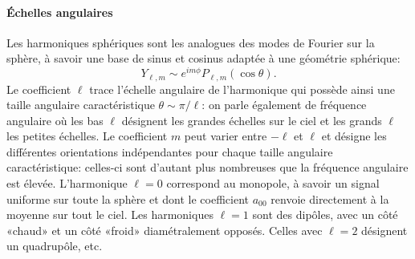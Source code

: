 \paragraph{Échelles angulaires}
 Les harmoniques sphériques sont les analogues des modes de Fourier sur la sphère, à savoir une base de sinus et cosinus adaptée à une géométrie sphérique:
\begin{equation}
Y_{\ell,m}\sim e^{im\phi} P_{\ell,m}(\cos \theta).
\end{equation} 
 Le coefficient $\ell$ trace l'échelle angulaire de l'harmonique qui possède ainsi une taille angulaire caractéristique $\theta\sim\pi/\ell$: on parle également de fréquence angulaire où les bas $\ell$ désignent les grandes échelles sur le ciel et les grands $\ell$ les petites échelles. Le coefficient $m$ peut varier entre $-\ell$ et $\ell$ et désigne les différentes orientations indépendantes pour chaque taille angulaire caractéristique: celles-ci sont d'autant plus nombreuses que la fréquence angulaire est élevée. L'harmonique $\ell=0$ correspond au monopole, à savoir un signal uniforme sur toute la sphère et dont le coefficient $a_{00}$ renvoie directement à la moyenne sur tout le ciel. Les harmoniques $\ell=1$ sont des dipôles, avec un côté «chaud» et un côté «froid» diamétralement opposés. Celles avec $\ell=2$ désignent un quadrupôle, etc.

